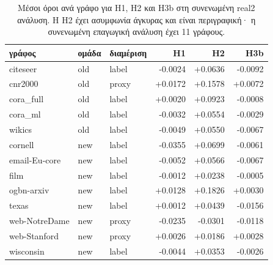 \begin{table}[t]
\centering
\scriptsize
\caption{Μέσοι όροι ανά γράφο για H1, H2 και H3b στη συνενωμένη real2 ανάλυση. Η H2 έχει ασυμφωνία άγκυρας και είναι περιγραφική· η συνενωμένη επαγωγική ανάλυση έχει 11 γράφους.}
\label{tab:v2real2}
\begin{tabular}{@{}lllrrr@{}}\toprule
γράφος & ομάδα & διαμέριση & H1 & H2 & H3b \\
\midrule
citeseer & old & label & -0.0024 & +0.0636 & -0.0092 \\
cnr2000 & old & proxy & +0.0172 & +0.1578 & +0.0072 \\
cora\_full & old & label & +0.0020 & +0.0923 & -0.0008 \\
cora\_ml & old & label & -0.0032 & +0.0554 & -0.0029 \\
wikics & old & label & -0.0049 & +0.0550 & -0.0067 \\
cornell & new & label & -0.0355 & +0.0699 & -0.0061 \\
email-Eu-core & new & label & -0.0052 & +0.0566 & -0.0067 \\
film & new & label & -0.0012 & +0.0238 & -0.0005 \\
ogbn-arxiv & new & label & +0.0128 & +0.1826 & +0.0030 \\
texas & new & label & +0.0012 & +0.0439 & -0.0156 \\
web-NotreDame & new & proxy & -0.0235 & -0.0301 & -0.0118 \\
web-Stanford & new & proxy & +0.0026 & +0.0186 & +0.0028 \\
wisconsin & new & label & -0.0044 & +0.0353 & -0.0026 \\
\bottomrule\end{tabular}
\end{table}
